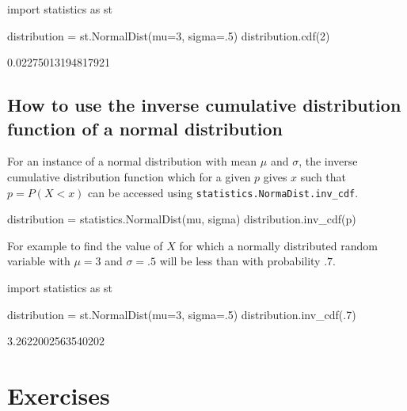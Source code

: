 \begin{pyin}
import statistics as st

distribution = st.NormalDist(mu=3, sigma=.5)
distribution.cdf(2)
\end{pyin}





\begin{raw}
0.02275013194817921
\end{raw}





\subsection{How to use the inverse cumulative distribution function of a normal distribution}
\label{\detokenize{tools-for-mathematics/08-statistics/how/main:how-to-use-the-inverse-cumulative-distribution-function-of-a-normal-distribution}}

For an instance of a normal distribution with mean \(\mu\) and \(\sigma\), the
inverse cumulative distribution function which for a given \(p\) gives \(x\) such that \(p=P(X<x)\)
can be accessed using \texttt{statistics.NormaDist.inv\_cdf}.


\begin{pyin}
distribution = statistics.NormalDist(mu, sigma)
distribution.inv_cdf(p)
\end{pyin}



For example to find the value of \(X\) for which a normally distributed random
variable with \(\mu=3\) and \(\sigma=.5\) will be less than with probability \(.7\).




\begin{pyin}
import statistics as st

distribution = st.NormalDist(mu=3, sigma=.5)
distribution.inv_cdf(.7)
\end{pyin}





\begin{raw}
3.2622002563540202
\end{raw}







\section{Exercises}
\label{\detokenize{tools-for-mathematics/08-statistics/exercises/main:exercises}}\label{\detokenize{tools-for-mathematics/08-statistics/exercises/main::doc}}

